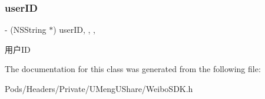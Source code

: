 \subsubsection{\texorpdfstring{user\+ID}{userID}}
{\footnotesize\ttfamily -\/ (N\+S\+String $\ast$) user\+ID\hspace{0.3cm}{\ttfamily [read]}, {\ttfamily [write]}, {\ttfamily [nonatomic]}, {\ttfamily [strong]}}

用户\+ID 

The documentation for this class was generated from the following file\+:\begin{DoxyCompactItemize}
\item 
Pods/\+Headers/\+Private/\+U\+Meng\+U\+Share/Weibo\+S\+D\+K.\+h\end{DoxyCompactItemize}
